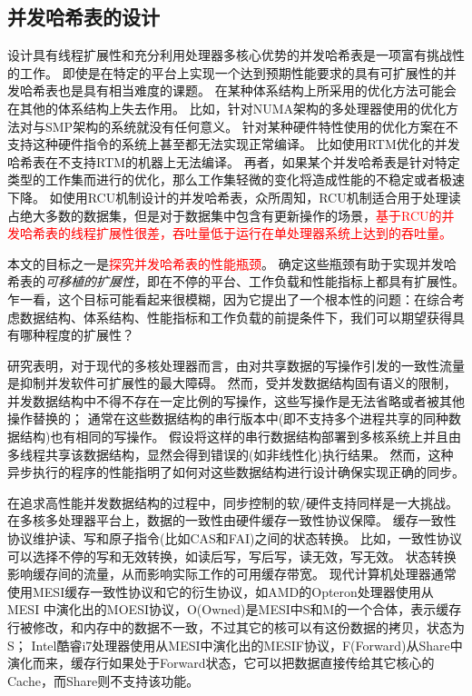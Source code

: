 \subsection{并发哈希表的设计}
设计具有线程扩展性和充分利用处理器多核心优势的并发哈希表是一项富有挑战性的工作。
即使是在特定的平台上实现一个达到预期性能要求的具有可扩展性的并发哈希表也是具有相当难度的课题。
在某种体系结构上所采用的优化方法可能会在其他的体系结构上失去作用\cite{baumann2009multikernel,david}。
比如，针对NUMA架构的多处理器使用的优化方法对与SMP架构的系统就没有任何意义\cite{david}。
针对某种硬件特性使用的优化方案在不支持这种硬件指令的系统上甚至都无法实现正常编译。
比如使用RTM优化的并发哈希表在不支持RTM的机器上无法编译。
再者，如果某个并发哈希表是针对特定类型的工作集而进行的优化，那么工作集轻微的变化将造成性能的不稳定或者极速下降。
如使用RCU机制设计的并发哈希表，众所周知，RCU机制适合用于处理读占绝大多数的数据集，但是对于数据集中包含有更新操作的场景，\textcolor{red}{基于RCU的并发哈希表的线程扩展性很差，吞吐量低于运行在单处理器系统上达到的吞吐量\cite{urcu}。}

本文的目标之一是\textcolor{red}{探究并发哈希表的性能瓶颈}。
确定这些瓶颈有助于实现并发哈希表的\textit{可移植的扩展性}，即在不停的平台、工作负载和性能指标上都具有扩展性。
乍一看，这个目标可能看起来很模糊，因为它提出了一个根本性的问题：在综合考虑数据结构、体系结构、性能指标和工作负载的前提条件下，我们可以期望获得具有哪种程度的扩展性？

研究表明，对于现代的多核处理器而言，由对共享数据的写操作引发的一致性流量是抑制并发软件可扩展性的最大障碍。
然而，受并发数据结构固有语义的限制，并发数据结构中不得不存在一定比例的写操作，这些写操作是无法省略或者被其他操作替换的；
通常在这些数据结构的串行版本中(即不支持多个进程共享的同种数据结构)也有相同的写操作。
假设将这样的串行数据结构部署到多核系统上并且由多线程共享该数据结构，显然会得到错误的(如非线性化\cite{herlihy1990linearizability})执行结果。
然而，这种异步执行的程序的性能指明了如何对这些数据结构进行设计确保实现正确的同步。

在追求高性能并发数据结构的过程中，同步控制的软/硬件支持同样是一大挑战。
在多核多处理器平台上，数据的一致性由硬件缓存一致性协议保障。
缓存一致性协议维护读、写和原子指令(比如CAS和FAI)之间的状态转换。
比如，一致性协议可以选择不停的写和无效转换，如读后写，写后写，读无效，写无效。
状态转换影响缓存间的流量，从而影响实际工作的可用缓存带宽。
现代计算机处理器通常使用MESI缓存一致性协议和它的衍生协议，如AMD的Opteron处理器使用从MESI 中演化出的MOESI协议，O(Owned)是MESI中S和M的一个合体，表示缓存行被修改，和内存中的数据不一致，不过其它的核可以有这份数据的拷贝，状态为S；
Intel酷睿i7处理器使用从MESI中演化出的MESIF协议，F(Forward)从Share中演化而来，缓存行如果处于Forward状态，它可以把数据直接传给其它核心的Cache，而Share则不支持该功能。

